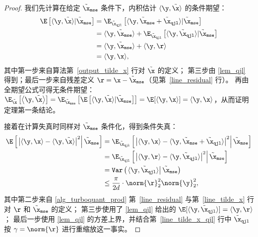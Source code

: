 \documentclass[11pt]{ctexart}
\let\cref\ref
\begin{document}
\begin{proof}
我们先计算在给定 $\tilde{\x}_{\tt mse}$ 条件下，内积估计 $\langle \y, \tilde{\x} \rangle$ 的条件期望：
\begin{align*}
    \E \left[ \langle \y, \tilde{\x} \rangle | \tilde{\x}_{\tt mse} \right] &= \E_{\tilde{\x}_{\tt qjl}} \left[ \langle \y, \tilde{\x}_{\tt mse} + \tilde{\x}_{\tt qjl} \rangle | \tilde{\x}_{\tt mse} \right]\\
    &= \langle \y, \tilde{\x}_{\tt mse} \rangle + \E_{\tilde{\x}_{\tt qjl}} \left[ \langle \y, \tilde{\x}_{\tt qjl} \rangle | \tilde{\x}_{\tt mse} \right] \\
    &= \langle \y, \tilde{\x}_{\tt mse} \rangle + \langle \y , \r \rangle\\
    &= \langle \y , \x \rangle,
\end{align*}
其中第一步来自算法第~\ref{output_tilde_x} 行对 $\tilde{\x}$ 的定义；
第三步由 \cref{lem_qjl} 得到；最后一步来自残差定义 $\r = \x - \tilde{\x}_{\tt mse}$（见第~\ref{line_residual} 行）。
再由全期望公式可得无条件期望：
$\E_{\tilde{\x}}\left[ \left< \y, \tilde{\x} \right> \right] = \E_{\tilde{\x}_{\tt mse}} \left[\E \left[ \langle \y, \tilde{\x} \rangle | \tilde{\x}_{\tt mse} \right] \right] = \E[\langle \y , \x \rangle] = \langle \y , \x \rangle$，从而证明定理第一条结论。

接着在计算失真时同样对 $\tilde{\x}_{\tt mse}$ 条件化，得到条件失真：
\begin{align*}
    \E\left[\left. \left| \langle \y, \x \rangle - \langle \y, \tilde{\x} \rangle \right|^2 \right| \tilde{\x}_{\tt mse} \right] &= \E_{\tilde{\x}_{\tt qjl}}\left[\left. \left| \langle \y, \x \rangle - \langle \y, \tilde{\x}_{\tt mse} + \tilde{\x}_{\tt qjl} \rangle \right|^2 \right| \tilde{\x}_{\tt mse} \right] \\
    &= \E_{\tilde{\x}_{\tt qjl}}\left[\left. \left| \langle \y, \r \rangle - \langle \y, \tilde{\x}_{\tt qjl} \rangle \right|^2 \right| \tilde{\x}_{\tt mse} \right] \\
    &= \mathtt{Var} \left( \left. \langle \y, \tilde{\x}_{\tt qjl} \rangle \right| \tilde{\x}_{\tt mse} \right) \\
    &\le \frac{\pi}{2d} \cdot \norm{\r}_2^2 \norm{\y}_2^2,
\end{align*}
其中第二步来自 \cref{alg_turboquant_prod} 第~\ref{line_residual} 与第~\ref{line_tilde_x} 行对 $\r$ 和 $\tilde{\x}_{\tt mse}$ 的定义；
第三步使用了 \cref{lem_qjl} 给出的 $\E[\langle \y, \tilde{\x}_{\tt qjl} \rangle] = \langle \y, \r \rangle$；
最后一步使用 \cref{lem_qjl} 的方差上界，并结合第~\ref{line_tilde_x_qjl} 行中 $\tilde{\x}_{\tt qjl}$ 按 $\gamma=\norm{\r}$ 进行重缩放这一事实。


\end{proof}
\end{document}
